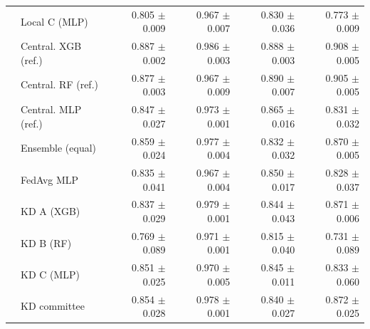 \begin{table}[t]
\begin{tabular}{llrrrr}
 & Local C (MLP) & 0.805 $\pm$ 0.009 & 0.967 $\pm$ 0.007 & 0.830 $\pm$ 0.036 & 0.773 $\pm$ 0.009 \\
 & Central. XGB (ref.) & 0.887 $\pm$ 0.002 & 0.986 $\pm$ 0.003 & 0.888 $\pm$ 0.003 & 0.908 $\pm$ 0.005 \\
 & Central. RF (ref.) & 0.877 $\pm$ 0.003 & 0.967 $\pm$ 0.009 & 0.890 $\pm$ 0.007 & 0.905 $\pm$ 0.005 \\
 & Central. MLP (ref.) & 0.847 $\pm$ 0.027 & 0.973 $\pm$ 0.001 & 0.865 $\pm$ 0.016 & 0.831 $\pm$ 0.032 \\
 & Ensemble (equal) & 0.859 $\pm$ 0.024 & 0.977 $\pm$ 0.004 & 0.832 $\pm$ 0.032 & 0.870 $\pm$ 0.005 \\
 & FedAvg MLP & 0.835 $\pm$ 0.041 & 0.967 $\pm$ 0.004 & 0.850 $\pm$ 0.017 & 0.828 $\pm$ 0.037 \\
 & KD A (XGB) & 0.837 $\pm$ 0.029 & 0.979 $\pm$ 0.001 & 0.844 $\pm$ 0.043 & 0.871 $\pm$ 0.006 \\
 & KD B (RF) & 0.769 $\pm$ 0.089 & 0.971 $\pm$ 0.001 & 0.815 $\pm$ 0.040 & 0.731 $\pm$ 0.089 \\
 & KD C (MLP) & 0.851 $\pm$ 0.025 & 0.970 $\pm$ 0.005 & 0.845 $\pm$ 0.011 & 0.833 $\pm$ 0.060 \\
 & KD committee & 0.854 $\pm$ 0.028 & 0.978 $\pm$ 0.001 & 0.840 $\pm$ 0.027 & 0.872 $\pm$ 0.025 \\
\bottomrule
\end{tabular}
\end{table}
